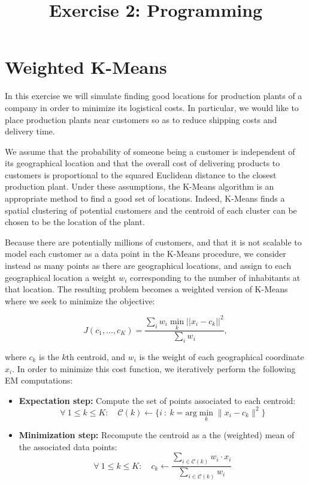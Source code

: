 \documentclass[11pt]{article}
\title{Exercise 2: Programming}
\begin{document}
    
    
    \maketitle
    
    

    
    \section{Weighted K-Means}\label{weighted-k-means}

In this exercise we will simulate finding good locations for production
plants of a company in order to minimize its logistical costs. In
particular, we would like to place production plants near customers so
as to reduce shipping costs and delivery time.

We assume that the probability of someone being a customer is
independent of its geographical location and that the overall cost of
delivering products to customers is proportional to the squared
Euclidean distance to the closest production plant. Under these
assumptions, the K-Means algorithm is an appropriate method to find a
good set of locations. Indeed, K-Means finds a spatial clustering of
potential customers and the centroid of each cluster can be chosen to be
the location of the plant.

Because there are potentially millions of customers, and that it is not
scalable to model each customer as a data point in the K-Means
procedure, we consider instead as many points as there are geographical
locations, and assign to each geographical location a weight \(w_i\)
corresponding to the number of inhabitants at that location. The
resulting problem becomes a weighted version of K-Means where we seek to
minimize the objective:

\[
J(c_1,\dots,c_K) = \frac{\sum_{i} w_i \min_k ||x_i-c_k||^2}{\sum_{i} w_i},
\]

where \(c_k\) is the \(k\)th centroid, and \(w_i\) is the weight of each
geographical coordinate \(x_i\). In order to minimize this cost
function, we iteratively perform the following EM computations:

\begin{itemize}
\item
  \textbf{Expectation step:} Compute the set of points associated to
  each centroid: \[
  \forall~1 \leq k \leq K: \quad \mathcal{C}(k) \leftarrow \Big\{ i ~:~ k = \mathrm{arg}\min_k \| x_i - c_k \|^2 \Big\}
  \]
\item
  \textbf{Minimization step:} Recompute the centroid as a the (weighted)
  mean of the associated data points: \[
  \forall~1 \leq k \leq K: \quad c_k \leftarrow \frac{\sum_{i \in \mathcal{C}(k)} w_i \cdot x_i}{\sum_{i \in \mathcal{C}(k)} w_i}
  \]
\end{itemize}
\end{document}
